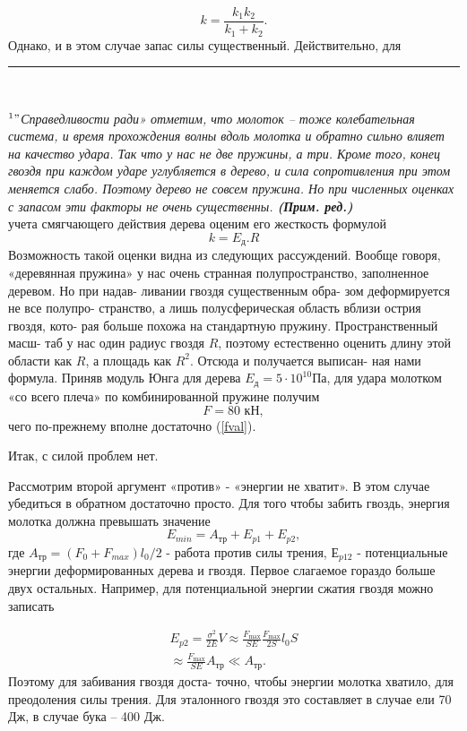 \begin{multicols}{3}
$$k = \frac{k_1k_2}{k_1 + k_2}.$$
Однако, и в этом случае запас силы существенный. Действительно, для \\

\noindent\rule{0.5\linewidth}{1pt} \\
\vskip -5pt

$^1"$\textit{Справедливости ради» отметим, что молоток -- тоже колебательная система, и время прохождения волны вдоль молотка и обратно сильно влияет на качество удара. Так что у нас не две пружины, а три. Кроме того, конец гвоздя при каждом ударе углубляется в дерево, и сила сопротивления при этом меняется слабо. Поэтому дерево не совсем пружина. Но при численных оценках \textit{с запасом} эти факторы не очень существенны. \textbf{(Прим. ред.)}} \\
учета смягчающего действия дерева оценим его жесткость формулой
$$k = E_\text{д}.R$$
Возможность такой оценки видна из следующих рассуждений. Вообще говоря, «деревянная пружина» у нас очень странная полупространство, заполненное деревом. Но при надав- ливании гвоздя существенным обра- зом деформируется не все полупро- странство, а лишь полусферическая область вблизи острия гвоздя, кото- рая больше похожа на стандартную пружину. Пространственный масш- таб у нас один
радиус гвоздя $R$,
поэтому естественно оценить длину этой области как $R$, а площадь как
$R^2$. Отсюда и получается выписан- ная нами формула. Приняв модуль Юнга для дерева $E_\text{д} = 5 \cdot10^{10} Па$, для
удара молотком «со всего плеча» по комбинированной пружине получим
\begin{equation}
    \label{fval}
    F = 80 \text{ кН},
\end{equation}
чего по-прежнему вполне достаточно (\ref{fval}).

Итак, с силой проблем нет.

Рассмотрим второй аргумент «против» - «энергии не хватит». В этом случае убедиться в обратном достаточно просто. Для того чтобы забить гвоздь, энергия молотка должна превышать значение
$$E_{min} = A_{\text{тр}}+E_{p1} + E_{p2},$$
где $A_{\text{тр}} = (F_0+ F_{max})l_0/2$
-
работа
против силы трения, $Е_{p12}$ - потенциальные энергии деформированных дерева и гвоздя. Первое слагаемое гораздо больше двух остальных. Например, для потенциальной энергии сжатия гвоздя можно записать

\begin{multline*}
E_{p2} = \frac{\sigma^2}{2E}V \approx \frac{F_{\text{max}}}{SE} \frac{F_{\text{max}}}{2S} l_0 S \\
\approx \frac{F_{\text{max}}}{SE} A_{\text{тр}} \ll A_{\text{тр}}.
\end{multline*}
Поэтому для забивания гвоздя доста- точно, чтобы энергии молотка хватило, для преодоления силы трения. Для эталонного гвоздя это составляет в случае ели 70 Дж, в случае бука -- 400 Дж.


\end{multicols}
